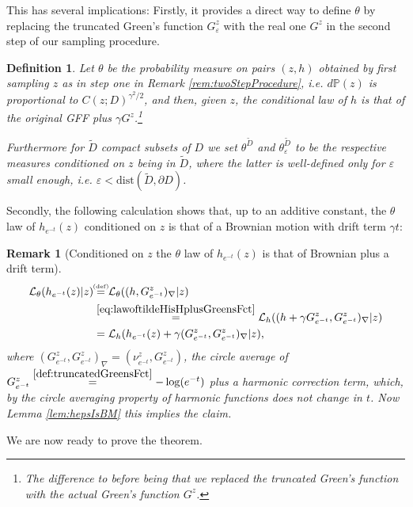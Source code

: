 \documentclass[11pt,reqno]{amsart}
\numberwithin{equation}{section}
\newtheorem{defi}[thm]{Definition}
\newtheorem{rem}[thm]{Remark}
\newcommand{\eqby}[1]{\mathrel{\stackrel{#1}{=}}}
\newcommand{\eqbydef}{\mathrel{\stackrel{\hspace*{-3mm}\text{\tiny(def)}\hspace*{-3mm}}{=}}}
\newcommand{\eps}{\varepsilon}
\begin{document}
This has several implications:
Firstly, it provides a direct way to define $\theta$ by replacing the truncated Green's function $G_\eps^z$ with the real one $G^z$ in the second step of our sampling procedure.
\begin{defi}
	Let $\theta$ be the probability measure on pairs $(z,h)$ obtained by first sampling $z$ as in step one in Remark \ref{rem:twoStepProcedure}, i.e. $d\mathbb P(z)$ is proportional to $C(z;D)^{\gamma^2/2}$, and then, given $z$, the conditional law of $h$ is that of the original GFF plus $\gamma G^z$.\footnote{The difference to before being that we replaced the truncated Green's function with the actual Green's function $G^z$.}
	
	Furthermore for $\tilde D$ compact subsets of $D$ we set $\theta^{\tilde D}$ and $\theta^{\tilde D}_\eps$ to be the respective measures conditioned on $z$ being in $\tilde D$, where the latter is well-defined only for $\eps$ small enough, i.e. $\eps<\text{dist}(\tilde D,\partial D)$.
\end{defi}

Secondly, the following calculation shows that, up to an additive constant, the $\theta$ law of $h_{e^{-t}}(z)$ conditioned on $z$ is that of a Brownian motion with drift term $\gamma t$:
\begin{rem}[Conditioned on $z$ the $\theta$ law of $h_{e^{-t}}(z)$ is that of Brownian plus a drift term]\label{rem:thetaBMthickpoints}
	\begin{align*}
		\mathcal L_\theta(h_{e^{-t}}(z)|z) &\eqbydef \mathcal L_\theta((h,G_{e^{-t}}^z)_\nabla|z)\\
		&\eqby{\eqref{eq:lawoftildeHisHplusGreensFct}} \mathcal L_h((h+\gamma G_{e^{-t}}^z,G_{e^{-t}}^z)_\nabla|z)\\
		&=\mathcal L_h(h_{e^{-t}}(z)+\gamma(G_{e^{-t}}^z,G_{e^{-t}}^z)_\nabla|z),
	\end{align*}
	where $(G_{e^{-t}}^z,G_{e^{-t}}^z)_\nabla = (\nu_{e^{-t}}^z,G_{e^{-t}}^z)$, the circle average of $G_{e^{-t}}^z \eqby{\ref{def:truncatedGreensFct}} -\log(e^{-t})$ plus a harmonic correction term, which, by the circle averaging property of harmonic functions does not change in $t$. Now Lemma \ref{lem:hepsIsBM} this implies the claim.
\end{rem}

We are now ready to prove the theorem.
\end{document}
